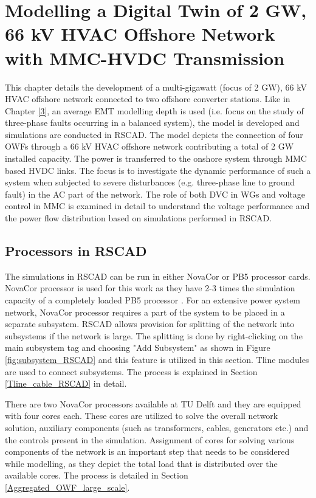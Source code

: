\chapter{Modelling a Digital Twin of 2 GW, 66 kV HVAC Offshore Network with MMC-HVDC Transmission}\label{4}
This chapter details the development of a multi-gigawatt (focus of 2 GW), 66 kV \gls{HVAC} offshore network connected to two offshore converter stations. Like in Chapter \ref{3}, an average \gls{EMT} modelling depth is used (i.e. focus on the study of three-phase faults occurring in a balanced system), the model is developed and simulations are conducted in RSCAD. The model depicts the connection of four \gls{OWF}s through a 66 kV \gls{HVAC} offshore network contributing a total of 2 GW installed capacity. The power is transferred to the onshore system through \gls{MMC} based \gls{HVDC} links. The focus is to investigate the dynamic performance of such a system when subjected to severe disturbances (e.g. three-phase line to ground fault) in the \gls{AC} part of the network. The role of both \gls{DVC} in \gls{WG}s and voltage control in \gls{MMC} is examined in detail to understand the voltage performance and the power flow distribution based on simulations performed in RSCAD. %

\section{Processors in RSCAD}\label{split_system}
The simulations in RSCAD can be run in either NovaCor or PB5 processor cards. NovaCor processor is used for this work as they have 2-3 times the simulation capacity of a completely loaded PB5 processor \cite{noauthor_novacor_nodate_1}. For an extensive power system network, NovaCor processor requires a part of the system to be placed in a separate subsystem. RSCAD allows provision for splitting of the network into subsystems if the network is large. The splitting is done by right-clicking on the main subsystem tag and choosing "Add Subsystem" as shown in Figure \ref{fig:subsystem_RSCAD} and this feature is utilized in this section. Tline modules are used to connect subsystems. The process is explained in Section \ref{Tline_cable_RSCAD} in detail.

There are two NovaCor processors available at TU Delft and they are equipped with four cores each. These cores are utilized to solve the overall network solution, auxiliary components (such as transformers, cables, generators etc.) and the controls present in the simulation. Assignment of cores for solving various components of the network is an important step that needs to be considered while modelling, as they depict the total load that is distributed over the available cores. The process is detailed in Section \ref{Aggregated_OWF_large_scale}. 

